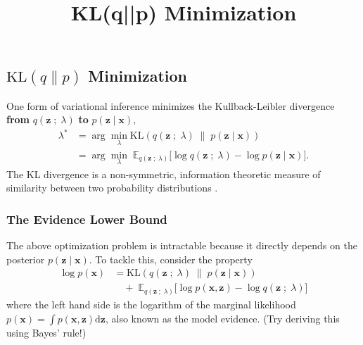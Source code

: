 \title{KL(q||p) Minimization}

\subsection{$\text{KL}(q\|p)$ Minimization}

One form of variational inference minimizes the Kullback-Leibler
divergence \textbf{from} $q(\mathbf{z}\;;\;\lambda)$ \textbf{to}
$p(\mathbf{z} \mid \mathbf{x})$,
\begin{align*}
  \lambda^*
  &=
  \arg\min_\lambda \text{KL}(
  q(\mathbf{z}\;;\;\lambda)
  \;\|\;
  p(\mathbf{z} \mid \mathbf{x})
  )\\
  &=
  \arg\min_\lambda\;
  \mathbb{E}_{q(\mathbf{z}\;;\;\lambda)}
  \big[
  \log q(\mathbf{z}\;;\;\lambda)
  -
  \log p(\mathbf{z} \mid \mathbf{x})
  \big].
\end{align*}
The KL divergence is a non-symmetric, information theoretic measure of
similarity between two probability distributions
\citep{hinton1993keeping,waterhouse1996bayesian,jordan1999introduction}.

\subsubsection{The Evidence Lower Bound}

The above optimization problem is intractable because it directly
depends on the posterior $p(\mathbf{z} \mid \mathbf{x})$. To tackle
this, consider the property
\begin{align*}
  \log p(\mathbf{x})
  &=
  \text{KL}(
  q(\mathbf{z}\;;\;\lambda)
  \;\|\;
  p(\mathbf{z} \mid \mathbf{x})
  )\\
  &\quad+\;
  \mathbb{E}_{q(\mathbf{z}\;;\;\lambda)}
  \big[
  \log p(\mathbf{x}, \mathbf{z})
  -
  \log q(\mathbf{z}\;;\;\lambda)
  \big]
\end{align*}
where the left hand side is the logarithm of the marginal likelihood
$p(\mathbf{x}) = \int p(\mathbf{x}, \mathbf{z}) \text{d}\mathbf{z}$,
also known as the model evidence. (Try deriving this using Bayes'
rule!)

